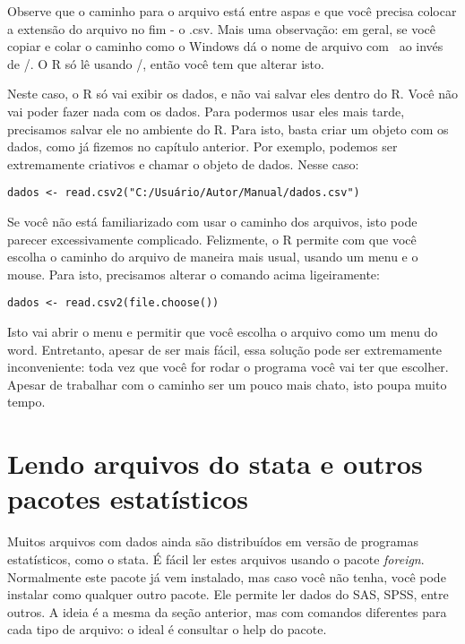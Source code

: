\documentclass[]{book}
\begin{document}
Observe que o caminho para o arquivo está entre aspas e que você precisa
colocar a extensão do arquivo no fim - o .csv. Mais uma observação: em
geral, se você copiar e colar o caminho como o Windows dá o nome de
arquivo com ~ao invés de /. O R só lê usando /, então você tem que
alterar isto.

Neste caso, o R só vai exibir os dados, e não vai salvar eles dentro do
R. Você não vai poder fazer nada com os dados. Para podermos usar eles
mais tarde, precisamos salvar ele no ambiente do R. Para isto, basta
criar um objeto com os dados, como já fizemos no capítulo anterior. Por
exemplo, podemos ser extremamente criativos e chamar o objeto de dados.
Nesse caso:

\begin{verbatim}
dados <- read.csv2("C:/Usuário/Autor/Manual/dados.csv")
\end{verbatim}

Se você não está familiarizado com usar o caminho dos arquivos, isto
pode parecer excessivamente complicado. Felizmente, o R permite com que
você escolha o caminho do arquivo de maneira mais usual, usando um menu
e o mouse. Para isto, precisamos alterar o comando acima ligeiramente:

\begin{verbatim}
dados <- read.csv2(file.choose())
\end{verbatim}

Isto vai abrir o menu e permitir que você escolha o arquivo como um menu
do word. Entretanto, apesar de ser mais fácil, essa solução pode ser
extremamente inconveniente: toda vez que você for rodar o programa você
vai ter que escolher. Apesar de trabalhar com o caminho ser um pouco
mais chato, isto poupa muito tempo.

\section{Lendo arquivos do stata e outros pacotes
estatísticos}\label{lendo-arquivos-do-stata-e-outros-pacotes-estatisticos}

Muitos arquivos com dados ainda são distribuídos em versão de programas
estatísticos, como o stata. É fácil ler estes arquivos usando o pacote
\emph{foreign}. Normalmente este pacote já vem instalado, mas caso você
não tenha, você pode instalar como qualquer outro pacote. Ele permite
ler dados do SAS, SPSS, entre outros. A ideia é a mesma da seção
anterior, mas com comandos diferentes para cada tipo de arquivo: o ideal
é consultar o help do pacote.
\end{document}
